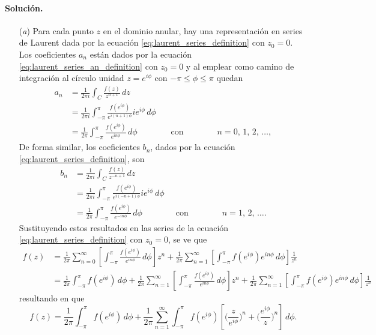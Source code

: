 \documentclass[a4paper]{report}
\begin{document}
\paragraph{Solución.} 
\begin{enumerate}
 \item[(\textit{a})] Para cada punto \(z\) en el dominio anular, hay una representación en series de Laurent dada por la ecuación \ref{eq:laurent_series_definition} con \(z_0=0\). Los coeficientes \(a_n\) están dados por la ecuación \ref{eq:laurent_series_an_definition} con \(z_0=0\) y al emplear como camino de integración al círculo unidad \(z=e^{i\phi}\) con \(-\pi\leq\phi\leq\pi\) quedan
 \begin{align*}
  a_n&=\frac{1}{2\pi i}\int_C\frac{f(z)}{z^{n+1}}\,dz\\
   &=\frac{1}{2\pi i}\int_{-\pi}^\pi\frac{f(e^{i\phi})}{e^{i(n+1)\phi}}ie^{i\phi}\,d\phi\\
   &=\frac{1}{2\pi}\int_{-\pi}^\pi\frac{f(e^{i\phi})}{e^{in\phi}}\,d\phi
  \qquad\qquad\textrm{con}\qquad\qquad
  n=0,\,1,\,2,\,\dots,
 \end{align*}
 De forma similar, los coeficientes \(b_n\), dados por la ecuación \ref{eq:laurent_series_definition}, son
 \begin{align*}
  b_n&=\frac{1}{2\pi i}\int_C\frac{f(z)}{z^{-n+1}}\,dz\\
   &=\frac{1}{2\pi i}\int_{-\pi}^\pi\frac{f(e^{i\phi})}{e^{i(-n+1)\phi}}ie^{i\phi}\,d\phi\\
   &=\frac{1}{2\pi}\int_{-\pi}^\pi\frac{f(e^{i\phi})}{e^{-in\phi}}\,d\phi
  \qquad\qquad\textrm{con}\qquad\qquad
  n=1,\,2,\,\dots.
 \end{align*}
 Sustituyendo estos resultados en las series de la ecuación \ref{eq:laurent_series_definition} con \(z_0=0\), se ve que 
 \begin{align*}
  f(z)&=\frac{1}{2\pi}\sum_{n=0}^\infty\left[\int_{-\pi}^\pi\frac{f(e^{i\phi})}{e^{in\phi}}\,d\phi\right]z^n+\frac{1}{2\pi}\sum_{n=1}^\infty\left[\int_{-\pi}^\pi f(e^{i\phi})e^{in\phi}\,d\phi\right]\frac{1}{z^n}\\
   &=\frac{1}{2\pi}\int_{-\pi}^\pi f(e^{i\phi})\,d\phi+\frac{1}{2\pi}\sum_{n=1}^\infty\left[\int_{-\pi}^\pi\frac{f(e^{i\phi})}{e^{in\phi}}\,d\phi\right]z^n+\frac{1}{2\pi}\sum_{n=1}^\infty\left[\int_{-\pi}^\pi f(e^{i\phi})e^{in\phi}\,d\phi\right]\frac{1}{z^n}
 \end{align*}
 resultando en que 
 \[
  f(z)=\frac{1}{2\pi}\int_{-\pi}^\pi f(e^{i\phi})\,d\phi+\frac{1}{2\pi}\sum_{n=1}^\infty\int_{-\pi}^\pi f(e^{i\phi})\left[\bigg(\frac{z}{e^{i\phi}}\bigg)^n+\bigg(\frac{e^{i\phi}}{z}\bigg)^n\right]\,d\phi.
\]
\end{enumerate}
\end{document}
